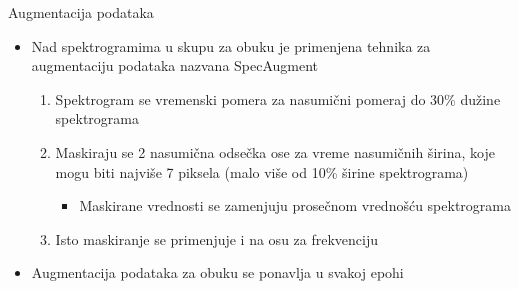 \documentclass{beamer}
\begin{document}
\begin{frame}{Augmentacija podataka}
    \begin{itemize}
        \item Nad spektrogramima u skupu za obuku je primenjena tehnika za augmentaciju podataka nazvana SpecAugment
        \begin{enumerate}
            \item Spektrogram se vremenski pomera za nasumični pomeraj do 30\% dužine spektrograma
            \item Maskiraju se 2 nasumična odsečka ose za vreme nasumičnih širina, koje mogu biti najviše 7 piksela (malo više od 10\% širine spektrograma)
            \begin{itemize}
                \item Maskirane vrednosti se zamenjuju prosečnom vrednošću spektrograma
            \end{itemize}
            \item Isto maskiranje se primenjuje i na osu za frekvenciju
        \end{enumerate}
    \item Augmentacija podataka za obuku se ponavlja u svakoj epohi
    \end{itemize}
\end{frame}
\end{document}
